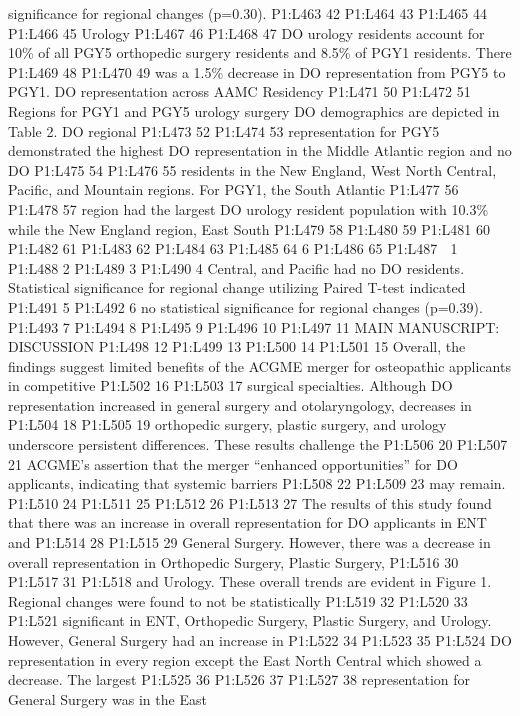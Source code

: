 significance for regional changes (p=0.30). P1:L463 42 P1:L464 43
P1:L465 44 P1:L466 45 Urology P1:L467 46 P1:L468 47 DO urology residents
account for 10\% of all PGY5 orthopedic surgery residents and 8.5\% of
PGY1 residents. There P1:L469 48 P1:L470 49 was a 1.5\% decrease in DO
representation from PGY5 to PGY1. DO representation across AAMC
Residency P1:L471 50 P1:L472 51 Regions for PGY1 and PGY5 urology
surgery DO demographics are depicted in Table 2. DO regional P1:L473 52
P1:L474 53 representation for PGY5 demonstrated the highest DO
representation in the Middle Atlantic region and no DO P1:L475 54
P1:L476 55 residents in the New England, West North Central, Pacific,
and Mountain regions. For PGY1, the South Atlantic P1:L477 56 P1:L478 57
region had the largest DO urology resident population with 10.3\% while
the New England region, East South P1:L479 58 P1:L480 59 P1:L481 60
P1:L482 61 P1:L483 62 P1:L484 63 P1:L485 64 6 P1:L486 65 P1:L487  1
P1:L488 2 P1:L489 3 P1:L490 4 Central, and Pacific had no DO residents.
Statistical significance for regional change utilizing Paired T-test
indicated P1:L491 5 P1:L492 6 no statistical significance for regional
changes (p=0.39). P1:L493 7 P1:L494 8 P1:L495 9 P1:L496 10 P1:L497 11
MAIN MANUSCRIPT: DISCUSSION P1:L498 12 P1:L499 13 P1:L500 14 P1:L501 15
Overall, the findings suggest limited benefits of the ACGME merger for
osteopathic applicants in competitive P1:L502 16 P1:L503 17 surgical
specialties. Although DO representation increased in general surgery and
otolaryngology, decreases in P1:L504 18 P1:L505 19 orthopedic surgery,
plastic surgery, and urology underscore persistent differences. These
results challenge the P1:L506 20 P1:L507 21 ACGME's assertion that the
merger ``enhanced opportunities'' for DO applicants, indicating that
systemic barriers P1:L508 22 P1:L509 23 may remain. P1:L510 24 P1:L511
25 P1:L512 26 P1:L513 27 The results of this study found that there was
an increase in overall representation for DO applicants in ENT and
P1:L514 28 P1:L515 29 General Surgery. However, there was a decrease in
overall representation in Orthopedic Surgery, Plastic Surgery, P1:L516
30 P1:L517 31 P1:L518 and Urology. These overall trends are evident in
Figure 1. Regional changes were found to not be statistically P1:L519 32
P1:L520 33 P1:L521 significant in ENT, Orthopedic Surgery, Plastic
Surgery, and Urology. However, General Surgery had an increase in
P1:L522 34 P1:L523 35 P1:L524 DO representation in every region except
the East North Central which showed a decrease. The largest P1:L525 36
P1:L526 37 P1:L527 38 representation for General Surgery was in the East
